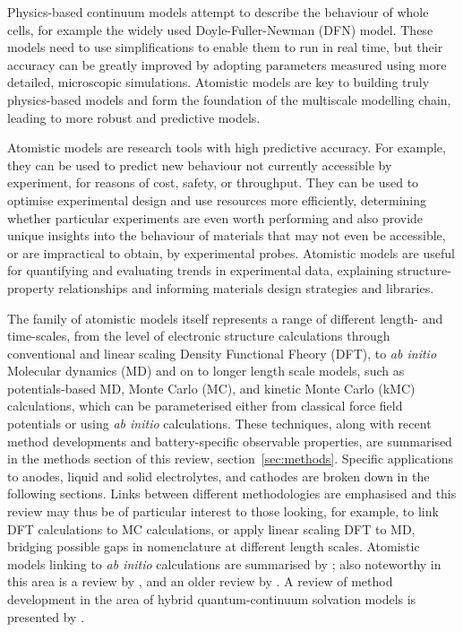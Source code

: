 \documentclass[../main.tex]{subfiles}
\begin{document}
Physics-based continuum models attempt to describe the behaviour of whole cells, for example the widely used Doyle-Fuller-Newman (DFN) model. \cite{doyle1993modeling,fuller1994simulation, Fuller1994a,Doyle1995,Newman2004} These models need to use simplifications to enable them to run in real time, but their accuracy can be greatly improved by adopting parameters measured using more detailed, microscopic simulations. Atomistic models are key to building truly physics-based models and form the foundation of the multiscale modelling chain, leading to more robust and predictive models.
 
Atomistic models are research tools with high predictive accuracy. For example, they can be used to predict new behaviour not currently accessible by experiment, for reasons of cost, safety, or throughput. They can be used to optimise experimental design and use resources more efficiently, determining whether particular experiments are even worth performing and also provide unique insights into the behaviour of materials that may not even be accessible, or are impractical to obtain, by experimental probes. Atomistic models are useful for quantifying and evaluating trends in experimental data, explaining structure-property relationships and informing materials design strategies and libraries.

The family of atomistic models itself represents a range of different length- and time-scales, from the level of electronic structure calculations through conventional and linear scaling Density Functional Fheory (DFT), to \textit{ab initio} Molecular dynamics (MD) and on to longer length scale models, such as potentials-based MD, Monte Carlo (MC), and kinetic Monte Carlo (kMC) calculations, which can be parameterised either from classical force field potentials or using \textit{ab initio} calculations. These techniques, along with recent method developments and battery-specific observable properties, are summarised in the methods section of this review, section~\ref{sec:methods}. Specific applications to anodes, liquid and solid electrolytes, and cathodes are broken down in the following sections. Links between different methodologies are emphasised and this review may thus be of particular interest to those looking, for example, to link DFT calculations to MC calculations, or apply linear scaling DFT to MD, bridging possible gaps in nomenclature at different length scales. Atomistic models linking to \textit{ab initio} calculations are summarised by \citeauthor{VanderVen2020} \cite{VanderVen2020}; also noteworthy in this area is a review by \citeauthor{Shi_2016},\cite{Shi_2016} and an older review by \citeauthor{franco2013multiscale}.\cite{franco2013multiscale} A review of method development in the area of hybrid quantum-continuum solvation models is presented by \citeauthor{Tomasi2005}.\cite{Tomasi2005}
\end{document}
